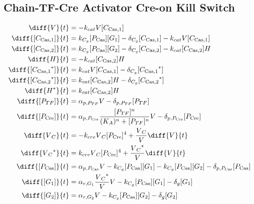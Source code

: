 \subsection{Chain-TF-Cre Activator Cre-on Kill Switch}
\label{s:Chain_TF_Cre_Activator_Cre_on_Kill_Switch}

\begin{align}
\diff{\vectorGen{}}{t} & = - \casCutRate{{}}\vectorGen{}\conc{\cplx{\cas}{1}}\\
\diff{\conc{\cplx{\cas}{1}}}{t} & =  \gRnaBind{}\conc{\proSp{\cas{}}}\conc{\gRna{1}} - \casCompDegradeRate{}\conc{\cplx{\cas}{1}} - \casCutRate{{}}\vectorGen{}\conc{\cplx{\cas}{1}}\\
\diff{\conc{\cplx{\cas}{2}}}{t} & =  \gRnaBind{}\conc{\proSp{\cas{}}}\conc{\gRna{2}} - \casCompDegradeRate{}\conc{\cplx{\cas}{2}} - \casCutRate{{}}\conc{\cplx{\cas}{2}}\hostGen{}\\
\diff{\hostGen{}}{t} & = - \casCutRate{{}}\conc{\cplx{\cas}{2}}\hostGen{}\\
\diff{\conc{\bound{\cplx{\cas}{1}}}}{t} & =  \casCutRate{{}}\vectorGen{}\conc{\cplx{\cas}{1}} - \casCompDegradeRate{}\conc{\bound{\cplx{\cas}{1}}}\\
\diff{\conc{\bound{\cplx{\cas}{2}}}}{t} & =  \casCutRate{{}}\conc{\cplx{\cas}{2}}\hostGen{} - \casCompDegradeRate{}\conc{\bound{\cplx{\cas}{2}}}\\
\diff{\edited{\hostGen{}}}{t} & =  \casCutRate{{}}\conc{\cplx{\cas}{2}}\hostGen{}\\
\diff{\conc{\proSp{TF}}}{t} & =  \txtlRate{\proSp{TF}}\vectorGen{} - \proDegradeRate{\proSp{TF}}\conc{\proSp{TF}}\\
\diff{\conc{\proSp{\cre{}}}}{t} & =  \txtlRate{\proSp{\cre{}}}\frac{\conc{\proSp{TF}}^n}{(K_A)^n + \conc{\proSp{TF}}^n}\vectorGen{} - \proDegradeRate{\proSp{\cre{}}}\conc{\proSp{\cre{}}}\\
\diff{\vectorGen{}_C}{t} & = - \creCutRate{} \vectorGen{}_C \conc{\proSp{\cre{}}}^4 + \frac{\vectorGen{}_C}{\vectorGen{}} \diff{\vectorGen{}}{t}\\
\diff{\edited{\vectorGen{}_C}}{t} & =  \creCutRate{} \vectorGen{}_C \conc{\proSp{\cre{}}}^4 + \frac{\edited{\vectorGen{}_C}}{\vectorGen{}} \diff{\vectorGen{}}{t}\\
\diff{\conc{\proSp{\cas{}}}}{t} & =  \txtlRate{\proSp{\cas{}}}\vectorGen{} - \gRnaBind{}\conc{\proSp{\cas{}}}\conc{\gRna{1}} - \gRnaBind{}\conc{\proSp{\cas{}}}\conc{\gRna{2}} - \proDegradeRate{\proSp{\cas{}}}\conc{\proSp{\cas{}}}\\
\diff{\conc{\gRna{1}}}{t} & =  \txRate{\gRna{1}}\frac{\edited{\vectorGen{}_C}}{\vectorGen{}}\vectorGen{} - \gRnaBind{}\conc{\proSp{\cas{}}}\conc{\gRna{1}} - \rnaDegradeRate{}\conc{\gRna{1}}\\
\diff{\conc{\gRna{2}}}{t} & =  \txRate{\gRna{2}}\vectorGen{} - \gRnaBind{}\conc{\proSp{\cas{}}}\conc{\gRna{2}} - \rnaDegradeRate{}\conc{\gRna{2}}
\end{align}

